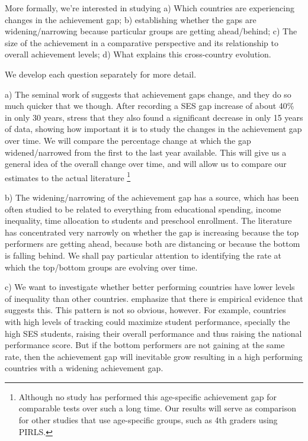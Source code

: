 \documentclass[11pt, a4paper]{article}\usepackage[]{graphicx}\usepackage[]{color}
\begin{document}
More formally, we're interested in studying
a) Which countries are experiencing changes in the achievement gap;
b) establishing whether the gaps are widening/narrowing because particular groups are getting ahead/behind;
c) The size of the achievement in a comparative perspective and its relationship to overall achievement levels;
d) What explains this cross-country evolution.

We develop each question separately for more detail.

a) The seminal work of \citet{reardon2011} suggests that achievement gaps change, and they do so much quicker that we though. After recording a SES gap increase of about 40\% in only 30 years, \citet{reardon_portilla} stress that they also found a significant decrease in only 15 years of data, showing how important it is to study the changes in the achievement gap over time. We will compare the percentage change at which the gap widened/narrowed from the first to the last year available. This will give us a general idea of the overall change over time, and will allow us to compare our estimates to the actual literature \footnote{Although no study has performed this age-specific achievement gap for comparable tests over such a long time. Our results will serve as comparison for other studies that use age-specific groups, such as 4th graders using PIRLS.}

b) The widening/narrowing of the achievement gap has a source, which has been often studied to be related to everything from educational spending, income inequality, time allocation to students and preschool enrollment. The literature has concentrated very narrowly on whether the gap is increasing because the top performers are getting ahead, because both are distancing or because the bottom is falling behind. We shall pay particular attention to identifying the rate at which the top/bottom groups are evolving over time.

c) We want to investigate whether better performing countries have lower levels of inequality than other countries. \citet{werfhorst_mijs} emphasize that there is empirical evidence that suggests this. This pattern is not so obvious, however. For example, countries with high levels of tracking could maximize student performance, specially the high SES students, raising their overall performance and thus raising the national performance score. But if the bottom performers are not gaining at the same rate, then the achievement gap will inevitable grow resulting in a high performing countries with a widening achievement gap.
\end{document}
